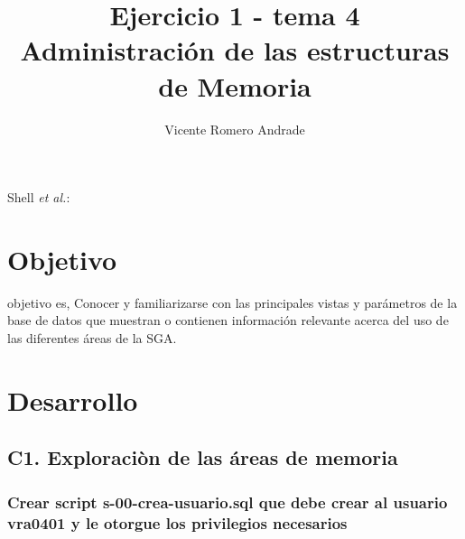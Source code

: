 \documentclass[journal]{IEEEtran}
\begin{document}
\title{Ejercicio 1 - tema 4 \\ Administración de las estructuras de Memoria}
%
\author{Vicente Romero Andrade}

%
{Shell \MakeLowercase{\textit{et al.}}: }

\maketitle


\IEEEpeerreviewmaketitle

\section{Objetivo}

 objetivo es, Conocer y familiarizarse con las principales vistas y parámetros 
de la base de datos que muestran o contienen información relevante acerca del uso
de las diferentes áreas de la SGA.

\section{Desarrollo}
\subsection{C1.  Exploraciòn de las áreas de memoria}
\subsubsection{Crear script s-00-crea-usuario.sql que debe crear al usuario vra0401 y le otorgue los privilegios necesarios}
\end{document}
